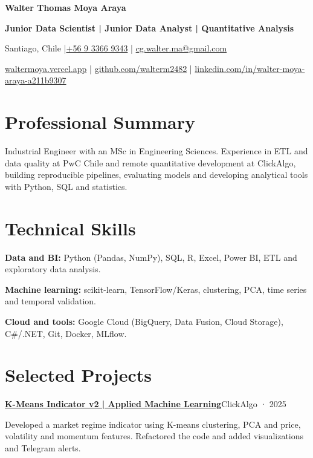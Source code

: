 \documentclass[10pt,a4paper]{article}
\newcommand{\project}[3]{\par\addvspace{3pt}\textbf{\href{#1}{#2}}\hfill{\fontsize{9.5}{11}\selectfont\color{muted}#3}\par\nopagebreak}
\begin{document}
\fontsize{10.7}{12.5}\selectfont
\RaggedRight
{}

{\fontsize{23}{26}\selectfont\bfseries\color{navy}Walter Thomas Moya Araya}\par
{\fontsize{11}{13}\selectfont\bfseries Junior Data Scientist | Junior Data Analyst | Quantitative Analysis}\par
{\fontsize{9.7}{11.5}\selectfont
Santiago, Chile \enspace|\enspace \href{tel:+56933669343}{+56 9 3366 9343} \enspace|\enspace
\href{mailto:cg.walter.ma@gmail.com}{cg.walter.ma@gmail.com}\par
\href{https://waltermoya.vercel.app/}{waltermoya.vercel.app} \enspace|\enspace
\href{https://github.com/walterm2482}{github.com/walterm2482} \enspace|\enspace
\href{https://www.linkedin.com/in/walter-moya-araya-a211b9307/}{linkedin.com/in/walter-moya-araya-a211b9307}}

\section{Professional Summary}
Industrial Engineer with an MSc in Engineering Sciences. Experience in ETL and data quality at PwC Chile
and remote quantitative development at ClickAlgo, building reproducible pipelines, evaluating models and
developing analytical tools with Python, SQL and statistics.

\section{Technical Skills}
\textbf{Data and BI:} Python (Pandas, NumPy), SQL, R, Excel, Power BI, ETL and exploratory data analysis.\par
\textbf{Machine learning:} scikit-learn, TensorFlow/Keras, clustering, PCA, time series and temporal validation.\par
\textbf{Cloud and tools:} Google Cloud (BigQuery, Data Fusion, Cloud Storage), C\#/.NET, Git, Docker, MLflow.

\section{Selected Projects}
\project{https://clickalgo.com/k-means}{K-Means Indicator v2 | Applied Machine Learning}{ClickAlgo · 2025}
Developed a market regime indicator using K-means clustering, PCA and price, volatility and momentum
features. Refactored the code and added visualizations and Telegram alerts.
\end{document}
